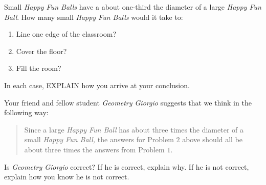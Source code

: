 \documentclass[handout,noauthor,nooutcomes,hints,12pt]{ximera}
\begin{document}
\begin{question}
Small \textit{Happy Fun Balls} have a about one-third the diameter of a large \textit{Happy Fun Ball}. How many small \textit{Happy Fun Balls} would it take to:
\begin{enumerate}
\item Line one edge of the classroom?
\item Cover the floor?
\item Fill the room?
\end{enumerate}
In each case,  EXPLAIN how you arrive at your conclusion.
\end{question}
\mynewpage




\begin{question}
  Your friend and fellow student \textit{Geometry Giorgio} suggests
  that we think in the following way:
\begin{quote}
  Since a large \textit{Happy Fun Ball} has about three times the
  diameter of a small \textit{Happy Fun Ball,} the answers for Problem
  $2$ above should all be about three times the answers from Problem
  $1$.
\end{quote}
Is \textit{Geometry Giorgio} correct?  If he is correct, explain
why. If he is not correct, explain how you know he is not correct. 
\end{question}
\end{document}
